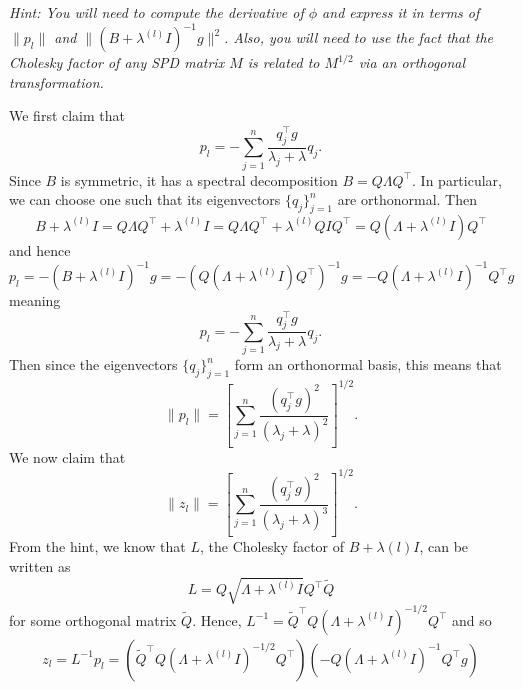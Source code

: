 \documentclass{../kin_math}
\begin{document}
\begin{questions}
  \emph{Hint: You will need to compute the derivative of $\phi$ and express it in terms of $\lVert p_l \rVert$ and $\lVert (B + \lambda^{(l)} I)^{-1} g \rVert^2$. Also, you will need to use the fact that the Cholesky factor of any SPD matrix $M$ is related to $M^{1 / 2}$ via an orthogonal transformation.}
  \begin{solution}
    We first claim that
    \begin{equation*}
      p_l = -\sum_{j = 1}^n \frac{q_j^\top g}{\lambda_j + \lambda} q_j.
    \end{equation*}
    Since $B$ is symmetric, it has a spectral decomposition $B = Q \Lambda Q^\top$. In particular, we can choose one such that its eigenvectors $\{q_j\}_{j = 1}^n$ are orthonormal. Then
    \begin{equation*}
      B + \lambda^{(l)} I = Q \Lambda Q^\top + \lambda^{(l)} I = Q \Lambda Q^\top + \lambda^{(l)} Q I Q^\top = Q (\Lambda + \lambda^{(l)} I) Q^\top
    \end{equation*}
    and hence
    \begin{equation*}
      p_l = -(B + \lambda^{(l)} I)^{-1} g = -\left(Q (\Lambda + \lambda^{(l)} I) Q^\top\right)^{-1} g = -Q (\Lambda + \lambda^{(l)} I)^{-1} Q^\top g
    \end{equation*}
    meaning
    \begin{equation*}
      p_l = -\sum_{j = 1}^n \frac{q_j^\top g}{\lambda_j + \lambda} q_j.
    \end{equation*}
    Then since the eigenvectors $\{q_j\}_{j = 1}^n$ form an orthonormal basis, this means that
    \begin{equation*}
      \lVert p_l \rVert = \left[\sum_{j = 1}^n \frac{(q_j^\top g)^2}{(\lambda_j + \lambda)^2}\right]^{1 / 2}.
    \end{equation*}
    We now claim that
    \begin{equation*}
      \lVert z_l \rVert = \left[\sum_{j = 1}^n \frac{(q_j^\top g)^2}{(\lambda_j + \lambda)^3}\right]^{1 / 2}.
    \end{equation*}
    From the hint, we know that $L$, the Cholesky factor of $B + \lambda{(l)} I$, can be written as
    \begin{equation*}
      L = Q \sqrt{\Lambda + \lambda^{(l)} I} Q^\top \tilde{Q}
    \end{equation*}
    for some orthogonal matrix $\tilde{Q}$. Hence, $L^{-1} = \tilde{Q}^\top Q (\Lambda + \lambda^{(l)} I)^{-1 / 2} Q^\top$ and so
    \begin{multline*}
      z_l = L^{-1} p_l = (\tilde{Q}^\top Q (\Lambda + \lambda^{(l)} I)^{-1 / 2} Q^\top)(-Q (\Lambda + \lambda^{(l)} I)^{-1} Q^\top g) \\

\end{multline*}
\end{solution}
\end{questions}
\end{document}
